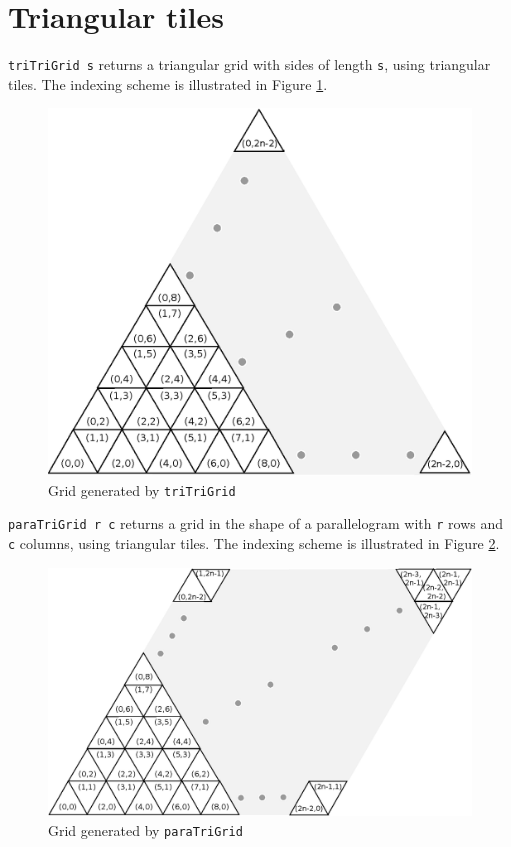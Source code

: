 \documentclass[a4paper,10pt]{article}
\begin{document}
\section{Triangular tiles}

\texttt{triTriGrid s} returns a triangular grid with sides of length \texttt{s}, using triangular tiles.
The indexing scheme is illustrated in Figure \ref{fig:triTriGrid}.

\begin{figure}[ht]
 \label{fig:triTriGrid}
 \centering
 \includegraphics{./images/triTriGrid.eps}
 \caption{Grid generated by \texttt{triTriGrid}}
\end{figure}


\texttt{paraTriGrid r c} returns a grid in the shape of a parallelogram with
\texttt{r} rows and \texttt{c} columns, using triangular tiles.
The indexing scheme is illustrated in Figure \ref{fig:paraTriGrid}.

\begin{figure}[ht]
 \label{fig:paraTriGrid}
 \centering
 \includegraphics[scale=0.9,keepaspectratio=true]{./images/paraTriGrid.eps}
 \caption{Grid generated by \texttt{paraTriGrid}}
\end{figure}
\end{document}
